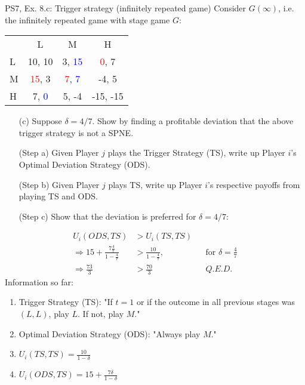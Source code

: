 \begin{frame}{PS7, Ex. 8.c: Trigger strategy (infinitely repeated game)}
    Consider $G(\infty)$, i.e. the infinitely repeated game with stage game $G$: \vspace{-6pt}
    \begin{table}
      \begin{tabular}{l|c|c|c|}
        \multicolumn{1}{c}{} & \multicolumn{1}{c}{L} & \multicolumn{1}{c}{M} & \multicolumn{1}{c}{H} \\\cline{2-4}
        L & 10, 10 & 3, \textcolor{blue}{15} & \textcolor{red}{0}, 7 \\\cline{2-4}
        M & \textcolor{red}{15}, 3 & \textcolor{red}{7}, \textcolor{blue}{7} & -4, 5 \\\cline{2-4}
        H & 7, \textcolor{blue}{0} & 5, -4 & -15, -15 \\\cline{2-4}
      \end{tabular}
    \end{table}
    \begin{itemize}
      \vspace{-4pt} \item[(c)] Suppose $\delta = 4/7$. Show by finding a profitable deviation that the above trigger strategy is not a SPNE. \vspace{-6pt}
    \end{itemize}
    \begin{multicols}{2}
      \begin{itemize}
        \item[(Step a)] Given Player $j$ plays the Trigger Strategy (TS), write up Player $i$'s Optimal Deviation Strategy (ODS).
        \item[(Step b)] Given Player $j$ plays TS, write up Player $i$'s respective payoffs from playing TS and ODS.
        \item[(Step c)] Show that the deviation is preferred for $\delta=4/7$:
      \end{itemize}
      \vspace{-8pt}
      \begin{align*}
        U_i\left(ODS,TS\right)&>U_i\left(TS,TS\right)\\
        \Rightarrow15+\frac{7\frac{4}{7}}{1-\frac{4}{7}}&>\frac{10}{1-\frac{4}{7}},&&\text{for }\delta=\frac{4}{7}\\
        \Rightarrow\frac{73}{3}&>\frac{70}{3}&&\textit{Q.E.D.}
      \end{align*}
      \vfill\null\columnbreak
      Information so far:
      \begin{enumerate}
        \item Trigger Strategy (TS): "If $t=1$ or if the outcome in all previous stages was $(L,L)$, play $L$. If not, play $M$."
        \item Optimal Deviation Strategy (ODS): "Always play $M$."
        \item $U_i(TS,TS)=\frac{10}{1-\delta}$
        \item $U_i(ODS,TS)=15+\frac{7\delta}{1-\delta}$
      \end{enumerate}
      \vfill\null
    \end{multicols}
\end{frame}



